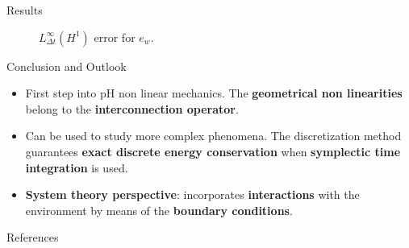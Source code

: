 \documentclass[aspectratio=169]{beamer}
\begin{document}
\begin{frame}{Results}
{\begin{figure}[b]
				\caption{$L^\infty_{\Delta t} (H^1)$ error for $e_w$.}
		\end{figure}
	}
\end{frame}

\begin{frame}{Conclusion and Outlook}
\begin{itemize}
	\item First step into pH non linear mechanics. The \textbf{geometrical non linearities} belong to the \textbf{interconnection operator}.
	\item Can be used to study more complex phenomena. The discretization method guarantees \textbf{exact discrete energy conservation} when \textbf{symplectic time integration} is used.
	\item \textbf{System theory perspective}: incorporates \textbf{interactions} with the environment by means of the \textbf{boundary conditions}.
\end{itemize}
\end{frame}

\appendix

\begin{frame}[allowframebreaks]{References}\label{lastslide}
	\printbibliography
\end{frame}
\end{document}

